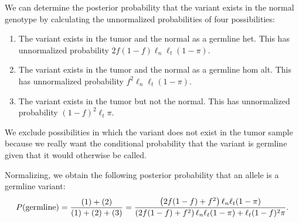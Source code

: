 \documentclass[nofootinbib,amssymb,amsmath]{revtex4}
\begin{document}
We can determine the posterior probability that the variant exists in the normal genotype by calculating the unnormalized probabilities of four possibilities:
\begin{enumerate}
\item The variant exists in the tumor and the normal as a germline het.  This has unnormalized probability $2f(1-f) \ell_n \ell_t (1 - \pi)$.
\item The variant exists in the tumor and the normal as a germline hom alt.  This has unnormalized probability $f^2 \ell_n \ell_t (1 - \pi)$.
\item The variant exists in the tumor but not the normal.  This has unnormalized probability $(1-f)^2 \ell_t \pi$.
\end{enumerate}

We exclude possibilities in which the variant does not exist in the tumor sample because we really want the conditional probability that the variant is germline given that it would otherwise be called.

Normalizing, we obtain the following posterior probability that an allele is a germline variant:
\begin{equation}
P({\rm germline}) = \frac{(1) + (2)}{(1) + (2) + (3)} = \frac{\left(2f(1-f) + f^2 \right) \ell_n \ell_t (1 - \pi)}{\left(2f(1-f) + f^2 \right) \ell_n \ell_t  (1 - \pi) + \ell_t (1-f)^2  \pi}.
\end{equation}
\end{document}
